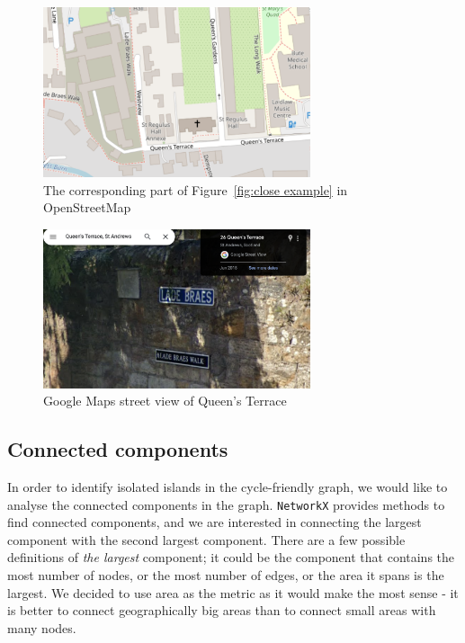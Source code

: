 \documentclass[12pt,a4paper]{report}
\begin{document}
\begin{figure}[ht]
    \centering
    \includegraphics[width=0.7\textwidth]{plan_images/osm_close.png}
    \caption{The corresponding part of Figure~\ref{fig:close example} in OpenStreetMap}
    \label{fig:osm close}
\end{figure}

\begin{figure}[ht]
    \centering
    \includegraphics[width=0.7\textwidth]{plan_images/googlemap_cross.png}
    \caption{Google Maps street view of Queen's Terrace}
    \label{fig:google close}
\end{figure}

\subsection{Connected components}
In order to identify isolated islands in the cycle-friendly graph, we would like to analyse the connected components in the graph. \texttt{NetworkX} provides methods to find connected components, and we are interested in connecting the largest component with the second largest component. There are a few possible definitions of \textit{the largest} component; it could be the component that contains the most number of nodes, or the most number of edges, or the area it spans is the largest. We decided to use area as the metric as it would make the most sense - it is better to connect geographically big areas than to connect small areas with many nodes.
\end{document}

